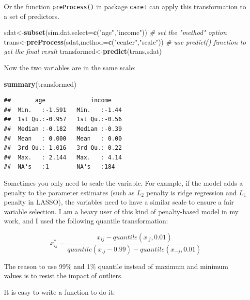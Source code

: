 \documentclass[12pt,]{krantz}
\newenvironment{Shaded}{\begin{snugshade}}{\end{snugshade}}
\newcommand{\KeywordTok}[1]{\textcolor[rgb]{0.13,0.29,0.53}{\textbf{{#1}}}}
\newcommand{\DataTypeTok}[1]{\textcolor[rgb]{0.13,0.29,0.53}{{#1}}}
\newcommand{\StringTok}[1]{\textcolor[rgb]{0.31,0.60,0.02}{{#1}}}
\newcommand{\CommentTok}[1]{\textcolor[rgb]{0.56,0.35,0.01}{\textit{{#1}}}}
\newcommand{\NormalTok}[1]{{#1}}
\theoremstyle{definition}
\theoremstyle{definition}
\theoremstyle{remark}
\begin{document}
Or the function \texttt{preProcess()} in package \texttt{caret} can
apply this transformation to a set of predictors.

\begin{Shaded}
\begin{Highlighting}[]
\NormalTok{sdat<-}\KeywordTok{subset}\NormalTok{(sim.dat,}\DataTypeTok{select=}\KeywordTok{c}\NormalTok{(}\StringTok{"age"}\NormalTok{,}\StringTok{"income"}\NormalTok{))}
\CommentTok{# set the "method" option}
\NormalTok{trans<-}\KeywordTok{preProcess}\NormalTok{(sdat,}\DataTypeTok{method=}\KeywordTok{c}\NormalTok{(}\StringTok{"center"}\NormalTok{,}\StringTok{"scale"}\NormalTok{))}
\CommentTok{# use predict() function to get the final result}
\NormalTok{transformed<-}\KeywordTok{predict}\NormalTok{(trans,sdat)}
\end{Highlighting}
\end{Shaded}

Now the two variables are in the same scale:

\begin{Shaded}
\begin{Highlighting}[]
\KeywordTok{summary}\NormalTok{(transformed)}
\end{Highlighting}
\end{Shaded}

\begin{verbatim}
##       age             income     
##  Min.   :-1.591   Min.   :-1.44  
##  1st Qu.:-0.957   1st Qu.:-0.56  
##  Median :-0.182   Median :-0.39  
##  Mean   : 0.000   Mean   : 0.00  
##  3rd Qu.: 1.016   3rd Qu.: 0.22  
##  Max.   : 2.144   Max.   : 4.14  
##  NA's   :1        NA's   :184
\end{verbatim}

Sometimes you only need to scale the variable. For example, if the model
adds a penalty to the parameter estimates (such as \(L_2\) penalty is
ridge regression and \(L_1\) penalty in LASSO), the variables need to
have a similar scale to ensure a fair variable selection. I am a heavy
user of this kind of penalty-based model in my work, and I used the
following quantile transformation:

\[
x_{ij}^{*}=\frac{x_{ij}-quantile(x_{.j},0.01)}{quantile(x_{.j}-0.99)-quantile(x_{-j},0.01)}
\]

The reason to use 99\% and 1\% quantile instead of maximum and minimum
values is to resist the impact of outliers.

It is easy to write a function to do it:
\end{document}
